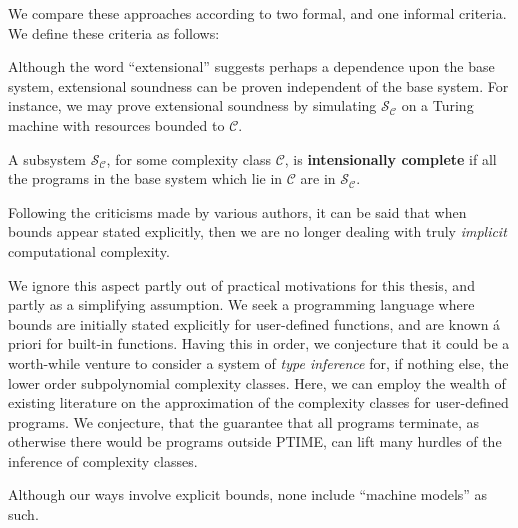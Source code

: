 We compare these approaches according to two formal, and one informal criteria.
We define these criteria as follows:


Although the word ``extensional'' suggests perhaps a dependence upon the base
system, extensional soundness can be proven independent of the base system.
For instance, we may prove extensional soundness by simulating $\mathcal{S_C}$
on a Turing machine with resources bounded to $\mathcal{C}$.

\begin{definition} A subsystem $\mathcal{S_C}$, for some complexity class
$\mathcal{C}$, is \textbf{intensionally complete} if all the programs in the
base system which lie in $\mathcal{C}$ are in $\mathcal{S_C}$. \end{definition}




Following the criticisms made by various authors\cite{bellantoni-cook-1992,
hofmann-2000, dal-lago-hofmann-2010}, it can be said that when bounds appear
stated explicitly, then we are no longer dealing with truly \emph{implicit}
computational complexity.

We ignore this aspect partly out of practical motivations for this thesis, and
partly as a simplifying assumption. We seek a programming language where bounds
are initially stated explicitly for user-defined functions, and are known á
priori for built-in functions. Having this in order, we conjecture that it
could be a worth-while venture to consider a system of \emph{type inference}
for, if nothing else, the lower order subpolynomial complexity classes. Here,
we can employ the wealth of existing literature on the approximation of the
complexity classes for user-defined programs. We conjecture, that the guarantee
that all programs terminate, as otherwise there would be programs outside
PTIME, can lift many hurdles of the inference of complexity classes.

Although our ways involve explicit bounds, none include ``machine models'' as such.


